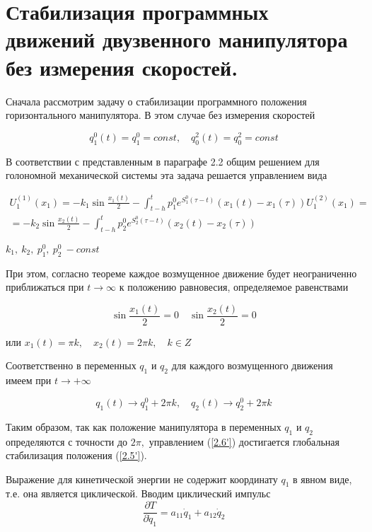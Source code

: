 \section{Стабилизация программных движений двузвенного манипулятора без измерения скоростей.} \label{p22}

Сначала рассмотрим задачу о стабилизации программного положения горизонтального манипулятора. В этом случае без измерения скоростей 

\begin{equation} \label{2.5'}
q^0_1 (t) = q^0_1 = const, \quad q^2_0 (t) = q^2_0 = const
\end{equation}

В соответствии с представленным в параграфе 2.2 общим решением для голономной механической системы эта задача решается управлением вида 

\begin{equation} \label{2.6'}
\begin{array}{c}
\displaystyle U^{(1)}_1 (x_1) = - k_1 \sin \frac{x_1(t)}{2} - \int_{t-h}^t p_1^0 e^{S_1^0 (\tau - t)} (x_1 (t) - x_1 (\tau)) U^{(2)}_1 (x_1) =\\
\displaystyle = - k_2 \sin \frac{x_2(t)}{2} - \int_{t-h}^t p_2^0 e^{S_2^0 (\tau - t)} (x_2 (t) - x_2 (\tau))
\end{array}
\end{equation}

$k_1, \ k_2, \ p_1^0, \ p_2^0 \ - const$

При этом, согласно теореме каждое возмущенное движение будет неограниченно приближаться при $t \to \infty$ к положению равновесия, определяемое равенствами 

$$\sin \frac{x_1(t)}{2} = 0 \quad \sin \frac{x_2(t)}{2} = 0$$

или $x_1(t) = \pi k, \quad x_2(t) = 2 \pi k, \quad k \in Z$

Соответственно в переменных $q_1$ и $q_2$ для каждого возмущенного движения имеем при $t \to +\infty$ 

\begin{equation}
q_1 (t) \to q_1^0 + 2 \pi k, \quad q_2(t) \to q_2^0 + 2 \pi k
\end{equation}


Таким образом, так как положение манипулятора в переменных $q_1$ и $q_2$ определяются с точности до $2 \pi,$ управлением (\ref{2.6'}) достигается глобальная стабилизация положения (\ref{2.5'}).

Выражение для кинетической энергии не содержит координату $q_1$ в явном виде, т.е. она является циклической. Вводим циклический импульс $$\frac{\partial T}{\partial \dot q_1} = a_{11} \dot q_1 + a_{12} \dot q_2$$


